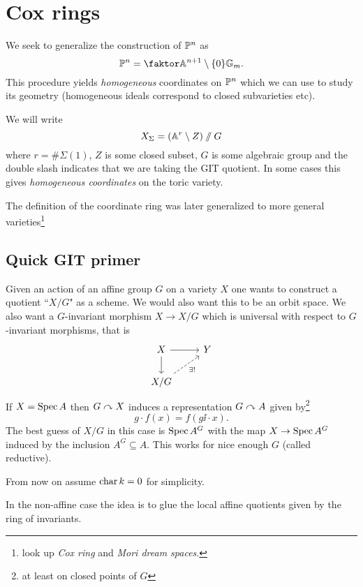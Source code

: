 \chapter{Cox rings}

We seek to generalize the construction of $\mathbb{P}^n$ as
\[\Pj^n=\quot{\A^{n+1}\nz}{\G_m}.\]
This procedure yields \textit{homogeneous} coordinates on $\mathbb{P}^n$ which we can use to study its geometry (homogeneous ideals correspond to closed subvarieties etc).

We will write
\[X_\Sigma=(\mathbb{A}^r\setminus Z)\sslash G\]
where $r=\#\Sigma(1)$, $Z$ is some closed subset, $G$ is some algebraic group and the double slash indicates that we are taking the GIT quotient. In some cases this gives \textit{homogeneous coordinates} on the toric variety.

The definition of the coordinate ring was later generalized to more general varieties\footnote{look up \textit{Cox ring} and \textit{Mori dream spaces}.}

\section{Quick GIT primer}
Given an action of an affine group $G$ on a variety $X$ one wants to construct a quotient ``$X/G$" as a scheme. We would also want this to be an orbit space. We also want a $G$-invariant morphism $X\to X/G$ which is universal with respect to $G$-invariant morphisms, that is
\[\begin{tikzcd}
	X & Y \\
	{X/G}
	\arrow[from=1-1, to=1-2]
	\arrow[from=1-1, to=2-1]
	\arrow["{\exists!}"', dashed, from=2-1, to=1-2]
\end{tikzcd}\]
If $X=\operatorname{Spec} A$ then $G\curvearrowright X$ induces a representation $G\curvearrowright A$ given by\footnote{at least on closed points of $G$} 
\[g\cdot f(x)=f(g\ii\cdot x).\] 
The best guess of $X/G$ in this case is $\operatorname{Spec} A^G$ with the map $X\to \operatorname{Spec} A^G$ induced by the inclusion $A^G\subseteq A$.
This works for nice enough $G$ (called reductive).


From now on assume $\operatorname{char} k=0$ for simplicity.

In the non-affine case the idea is to glue the local affine quotients given by the ring of invariants.

